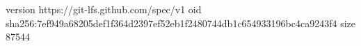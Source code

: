 version https://git-lfs.github.com/spec/v1
oid sha256:7ef949a68205def1f364d2397ef52eb1f2480744db1c654933196bc4ca9243f4
size 87544
